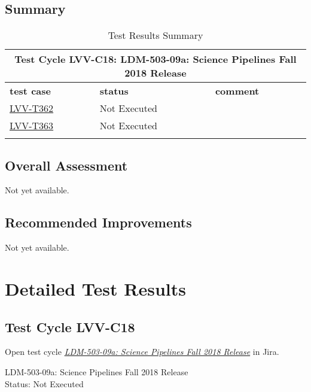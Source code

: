 \documentclass[DM,lsstdraft,STR,toc]{lsstdoc}
\begin{document}
\subsection{Summary}
\label{sect:summarytable}

\begin{longtable} {p{}p{}p{}}
\toprule
  \multicolumn{3}{c}{ Test Cycle {\bf LVV-C18: LDM-503-09a: Science Pipelines Fall 2018 Release }} \\\hline
  {\bf \footnotesize test case} & {\bf \footnotesize status} & {\bf \footnotesize comment} \\\toprule
    \href{https://jira.lsstcorp.org/secure/Tests.jspa#/testCase/LVV-T362}{LVV-T362} 
    & Not Executed & 
    \\\hline
    \href{https://jira.lsstcorp.org/secure/Tests.jspa#/testCase/LVV-T363}{LVV-T363} 
    & Not Executed & 
    \\\hline

\caption{Test Results Summary}
\label{table:summary}
\end{longtable}

\subsection{Overall Assessment}
\label{sect:overallassessment}

Not yet available.

\subsection{Recommended Improvements}
\label{sect:recommendations}

Not yet available.

\newpage
\section{Detailed Test Results}
\label{sect:detailedtestresults}


  \subsection{Test Cycle LVV-C18 }

Open test cycle {\it \href{https://jira.lsstcorp.org/secure/Tests.jspa#/testrun/LVV-C18}{LDM-503-09a: Science Pipelines Fall 2018 Release}} in Jira.

  LDM-503-09a: Science Pipelines Fall 2018 Release\\
  Status: Not Executed
\end{document}
